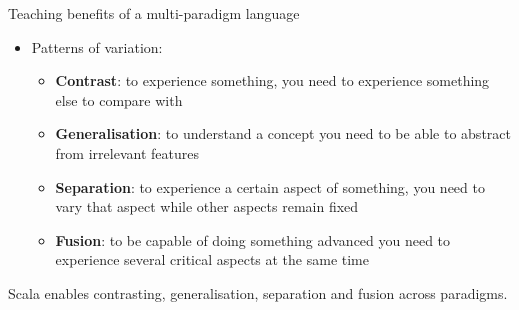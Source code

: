 \documentclass[aspectratio=169]{beamer}
\newenvironment{Slide}[1]%
  {\begin{frame}[environment=Slide]{#1}}
  {\end{frame}}%
\begin{document}
\begin{Slide}{Teaching benefits of a multi-paradigm language}
\begin{minipage}{0.85\textwidth}
\begin{itemize}
      \item Patterns of variation:
      \begin{itemize}
        \item \textbf{Contrast}: to experience something, you need to experience something else to compare with    
        \item \textbf{Generalisation}: to understand a concept you need to be able to abstract from irrelevant features    
        \item \textbf{Separation}: to experience a certain aspect of something, you need to vary that aspect while other aspects remain fixed    
        \item \textbf{Fusion}: to be capable of doing something advanced you need to experience several critical aspects at the same time    
      \end{itemize}
    \end{itemize}
  \end{minipage}
  
  \vspace{1em} Scala enables contrasting, generalisation, separation and fusion across paradigms.
  
  \end{Slide}
  
\end{document}
